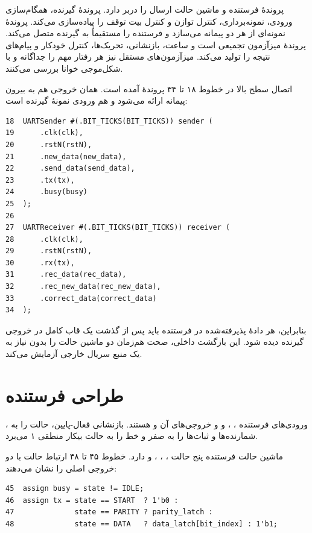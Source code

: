 پروندهٔ  فرستنده و ماشین
حالت ارسال را دربر دارد. پروندهٔ 
گیرنده، همگام‌سازی ورودی،
نمونه‌برداری، کنترل توازن و کنترل بیت توقف را پیاده‌سازی می‌کند.
پروندهٔ  نمونه‌ای از هر دو پیمانه می‌سازد و
 فرستنده را مستقیماً به  گیرنده متصل می‌کند. پروندهٔ 
میزآزمون تجمیعی است و ساعت، بازنشانی،
تحریک‌ها، کنترل خودکار و پیام‌های نتیجه را تولید
می‌کند. میزآزمون‌های مستقل نیز هر رفتار مهم را جداگانه و با شکل‌موجی خوانا بررسی می‌کنند.

اتصال سطح بالا در خطوط ۱۸ تا ۳۴ پروندهٔ  آمده است. همان خروجی
 هم به بیرون پیمانه ارائه می‌شود و هم ورودی  نمونهٔ گیرنده است:

\begin{dsdlcodeblock}
\begin{verbatim}
18  UARTSender #(.BIT_TICKS(BIT_TICKS)) sender (
19      .clk(clk),
20      .rstN(rstN),
21      .new_data(new_data),
22      .send_data(send_data),
23      .tx(tx),
24      .busy(busy)
25  );
26
27  UARTReceiver #(.BIT_TICKS(BIT_TICKS)) receiver (
28      .clk(clk),
29      .rstN(rstN),
30      .rx(tx),
31      .rec_data(rec_data),
32      .rec_new_data(rec_new_data),
33      .correct_data(correct_data)
34  );
\end{verbatim}
\end{dsdlcodeblock}

بنابراین، هر دادهٔ پذیرفته‌شده در فرستنده باید پس از گذشت یک قاب کامل در خروجی گیرنده
دیده شود. این بازگشت داخلی، صحت هم‌زمان دو ماشین حالت را بدون نیاز به یک منبع سریال
خارجی آزمایش می‌کند.


\section{طراحی فرستنده}

ورودی‌های فرستنده ، ،  و
 و خروجی‌های آن  و  هستند.
بازنشانی فعال-پایین، حالت را به ،
شمارنده‌ها و ثبات‌ها را به صفر و خط
 را به
حالت بیکار منطقی ۱ می‌برد.

ماشین حالت فرستنده پنج حالت ، ، ،  و
 دارد. خطوط ۴۵ تا ۴۸ ارتباط حالت با دو خروجی اصلی را نشان می‌دهند:

\begin{dsdlcodeblock}
\begin{verbatim}
45  assign busy = state != IDLE;
46  assign tx = state == START  ? 1'b0 :
47              state == PARITY ? parity_latch :
48              state == DATA   ? data_latch[bit_index] : 1'b1;
\end{verbatim}
\end{dsdlcodeblock}


